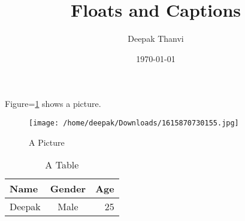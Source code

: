 \documentclass{article}
\title{Floats and Captions}
\author{Deepak Thanvi}
\date{\today}
\begin{document}
\maketitle

Figure=\ref{my_picture} shows a picture. 

\begin{figure}[htbp!]

	\begin{center}
		
		\texttt{[image: /home/deepak/Downloads/1615870730155.jpg]}
	
	\end{center}
	
	\caption{A Picture}
	\label{my_picture}

\end{figure}


\begin{table}

	\begin{center}

		\begin{tabular}{l|c|r}
		\toprule
		Name & Gender & Age\\
		\midrule
		Deepak & Male & 25\\
		\bottomrule		
		\end{tabular}			
	\end{center}
	\caption{A Table}
	\label{tab:my_table}


\end{table}
\end{document}
